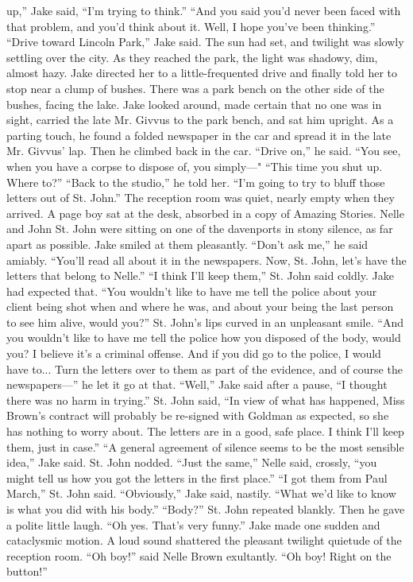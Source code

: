 \documentclass{novel}
\begin{document}
up,” Jake said, “I’m trying to think.” “And you said you’d never been faced with that problem, and you’d think about it. Well, I hope you’ve been thinking.” “Drive toward Lincoln Park,” Jake said. The sun had set, and twilight was slowly settling over the city. As they reached the park, the light was shadowy, dim, almost hazy. Jake directed her to a little-frequented drive and finally told her to stop near a clump of bushes. There was a park bench on the other side of the bushes, facing the lake. Jake looked around, made certain that no one was in sight, carried the late Mr. Givvus to the park bench, and sat him upright. As a parting touch, he found a folded newspaper in the car and spread it in the late Mr. Givvus’ lap. Then he climbed back in the car. “Drive on,” he said. “You see, when you have a corpse to dispose of, you simply—" “This time you shut up. Where to?” “Back to the studio,” he told her. “I’m going to try to bluff those letters out of St. John.” The reception room was quiet, nearly empty when they arrived. A page boy sat at the desk, absorbed in a copy of Amazing Stories. Nelle and John St. John were sitting on one of the davenports in stony silence, as far apart as possible. Jake smiled at them pleasantly. “Don’t ask me,” he said amiably. “You’ll read all about it in the newspapers. Now, St. John, let’s have the letters that belong to Nelle.” “I think I’ll keep them,” St. John said coldly. Jake had expected that. “You wouldn’t like to have me tell the police about your client being shot when and where he was, and about your being the last person to see him alive, would you?” St. John’s lips curved in an unpleasant smile. “And you wouldn’t like to have me tell the police how you disposed of the body, would you? I believe it’s a criminal offense. And if you did go to the police, I would have to... Turn the letters over to them as part of the evidence, and of course the newspapers—” he let it go at that. “Well,” Jake said after a pause, “I thought there was no harm in trying.” St. John said, “In view of what has happened, Miss Brown’s contract will probably be re-signed with Goldman as expected, so she has nothing to worry about. The letters are in a good, safe place. I think I’ll keep them, just in case.” “A general agreement of silence seems to be the most sensible idea,” Jake said. St. John nodded. “Just the same,” Nelle said, crossly, “you might tell us how you got the letters in the first place.” “I got them from Paul March,” St. John said. “Obviously,” Jake said, nastily. “What we’d like to know is what you did with his body.” “Body?” St. John repeated blankly. Then he gave a polite little laugh. “Oh yes. That’s very funny.” Jake made one sudden and cataclysmic motion. A loud sound shattered the pleasant twilight quietude of the reception room. “Oh boy!” said Nelle Brown exultantly. “Oh boy! Right on the button!”
\end{document}
